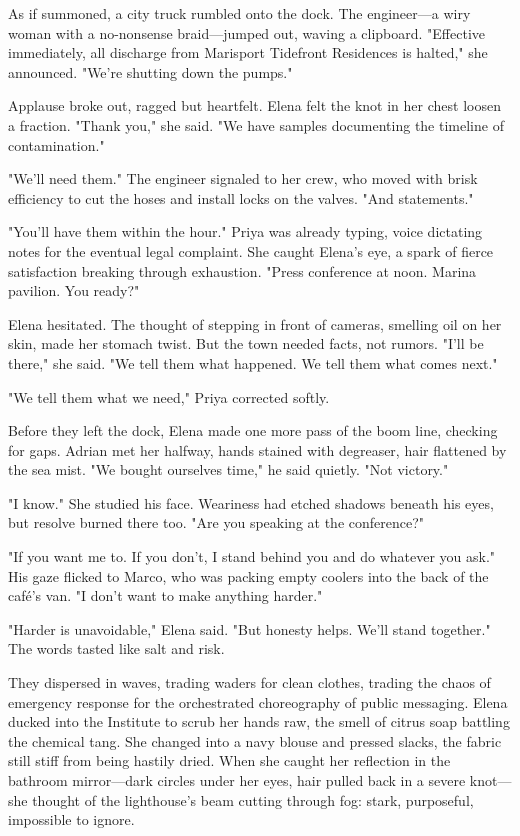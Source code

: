 As if summoned, a city truck rumbled onto the dock. The engineer—a wiry woman with a no-nonsense braid—jumped out, waving a clipboard. "Effective immediately, all discharge from Marisport Tidefront Residences is halted," she announced. "We're shutting down the pumps."

Applause broke out, ragged but heartfelt. Elena felt the knot in her chest loosen a fraction. "Thank you," she said. "We have samples documenting the timeline of contamination."

"We'll need them." The engineer signaled to her crew, who moved with brisk efficiency to cut the hoses and install locks on the valves. "And statements."

"You'll have them within the hour." Priya was already typing, voice dictating notes for the eventual legal complaint. She caught Elena's eye, a spark of fierce satisfaction breaking through exhaustion. "Press conference at noon. Marina pavilion. You ready?"

Elena hesitated. The thought of stepping in front of cameras, smelling oil on her skin, made her stomach twist. But the town needed facts, not rumors. "I'll be there," she said. "We tell them what happened. We tell them what comes next."

"We tell them what we need," Priya corrected softly.

Before they left the dock, Elena made one more pass of the boom line, checking for gaps. Adrian met her halfway, hands stained with degreaser, hair flattened by the sea mist. "We bought ourselves time," he said quietly. "Not victory."

"I know." She studied his face. Weariness had etched shadows beneath his eyes, but resolve burned there too. "Are you speaking at the conference?"

"If you want me to. If you don't, I stand behind you and do whatever you ask." His gaze flicked to Marco, who was packing empty coolers into the back of the café's van. "I don't want to make anything harder."

"Harder is unavoidable," Elena said. "But honesty helps. We'll stand together." The words tasted like salt and risk.

They dispersed in waves, trading waders for clean clothes, trading the chaos of emergency response for the orchestrated choreography of public messaging. Elena ducked into the Institute to scrub her hands raw, the smell of citrus soap battling the chemical tang. She changed into a navy blouse and pressed slacks, the fabric still stiff from being hastily dried. When she caught her reflection in the bathroom mirror—dark circles under her eyes, hair pulled back in a severe knot—she thought of the lighthouse's beam cutting through fog: stark, purposeful, impossible to ignore.

